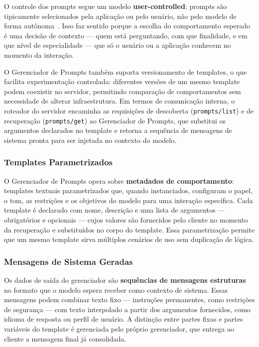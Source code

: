 \documentclass[12pt]{article}
\begin{document}
O controle dos prompts segue um modelo \textbf{user-controlled}: prompts
são tipicamente selecionados pela aplicação ou pelo usuário, não pelo
modelo de forma autônoma~\cite{philschmid2025mcp}. Isso faz sentido porque
a escolha do comportamento esperado é uma decisão de contexto --- quem está
perguntando, com que finalidade, e em que nível de especialidade ---
que só o usuário ou a aplicação conhecem no momento da interação.

O Gerenciador de Prompts também suporta versionamento de templates, o que
facilita experimentação controlada: diferentes versões de um mesmo
template podem coexistir no servidor, permitindo comparação de
comportamentos sem necessidade de alterar infraestrutura. Em termos de
comunicação interna, o roteador do servidor encaminha as requisições de
descoberta (\texttt{prompts/list}) e de recuperação
(\texttt{prompts/get}) ao Gerenciador de Prompts, que substitui os
argumentos declarados no template e retorna a sequência de mensagens
de sistema pronta para ser injetada no contexto do modelo.

\subsubsection{Templates Parametrizados}

O Gerenciador de Prompts opera sobre \textbf{metadados de comportamento}:
templates textuais parametrizados que, quando instanciados, configuram o
papel, o tom, as restrições e os objetivos do modelo para uma interação
específica. Cada template é declarado com nome, descrição e uma lista de
argumentos --- obrigatórios e opcionais --- cujos valores são fornecidos
pelo cliente no momento da recuperação e substituídos no corpo do template.
Essa parametrização permite que um mesmo template sirva múltiplos cenários
de uso sem duplicação de lógica.

\subsubsection{Mensagens de Sistema Geradas}

Os dados de saída do gerenciador são \textbf{sequências de mensagens
estruturas} no formato que o modelo espera receber como contexto de
sistema. Essas mensagens podem combinar texto fixo --- instruções
permanentes, como restrições de segurança --- com texto interpolado a
partir dos argumentos fornecidos, como idioma de resposta ou perfil de
usuário. A distinção entre partes fixas e partes variáveis do template é
gerenciada pelo próprio gerenciador, que entrega ao cliente a mensagem
final já consolidada.
\end{document}
